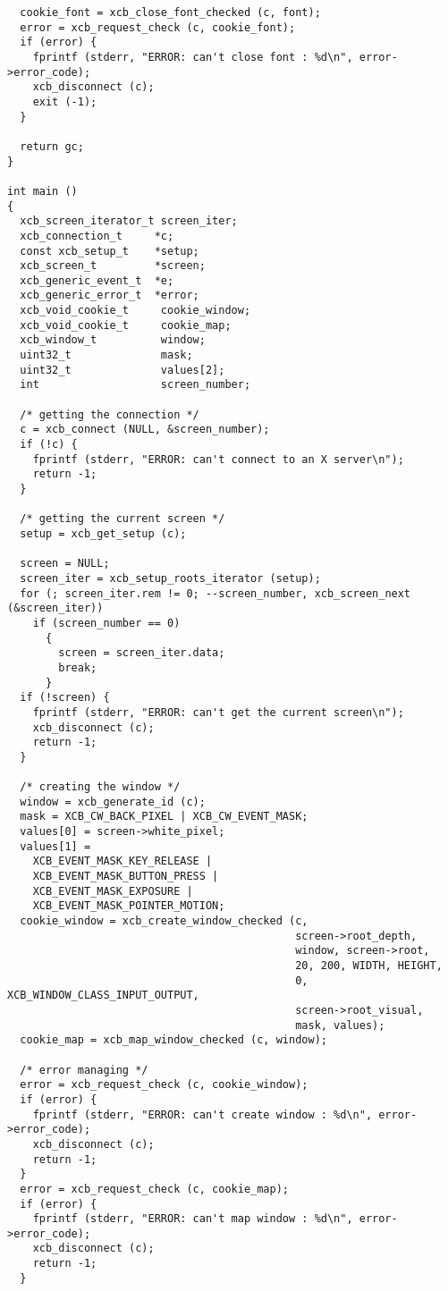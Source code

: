 \documentclass[12pt,oneside,titlepage]{book}
\begin{document}
\begin{enumerate}
\begin{enumerate}
\begin{verbatim}
  cookie_font = xcb_close_font_checked (c, font);
  error = xcb_request_check (c, cookie_font);
  if (error) {
    fprintf (stderr, "ERROR: can't close font : %d\n", error->error_code);
    xcb_disconnect (c);
    exit (-1);
  }

  return gc;
}

int main ()
{
  xcb_screen_iterator_t screen_iter;
  xcb_connection_t     *c;
  const xcb_setup_t    *setup;
  xcb_screen_t         *screen;
  xcb_generic_event_t  *e;
  xcb_generic_error_t  *error;
  xcb_void_cookie_t     cookie_window;
  xcb_void_cookie_t     cookie_map;
  xcb_window_t          window;
  uint32_t              mask;
  uint32_t              values[2];
  int                   screen_number;

  /* getting the connection */
  c = xcb_connect (NULL, &screen_number);
  if (!c) {
    fprintf (stderr, "ERROR: can't connect to an X server\n");
    return -1;
  }

  /* getting the current screen */
  setup = xcb_get_setup (c);

  screen = NULL;
  screen_iter = xcb_setup_roots_iterator (setup);
  for (; screen_iter.rem != 0; --screen_number, xcb_screen_next (&screen_iter))
    if (screen_number == 0)
      {
        screen = screen_iter.data;
        break;
      }
  if (!screen) {
    fprintf (stderr, "ERROR: can't get the current screen\n");
    xcb_disconnect (c);
    return -1;
  }

  /* creating the window */
  window = xcb_generate_id (c);
  mask = XCB_CW_BACK_PIXEL | XCB_CW_EVENT_MASK;
  values[0] = screen->white_pixel;
  values[1] =
    XCB_EVENT_MASK_KEY_RELEASE |
    XCB_EVENT_MASK_BUTTON_PRESS |
    XCB_EVENT_MASK_EXPOSURE |
    XCB_EVENT_MASK_POINTER_MOTION;
  cookie_window = xcb_create_window_checked (c,
                                             screen->root_depth,
                                             window, screen->root,
                                             20, 200, WIDTH, HEIGHT,
                                             0, XCB_WINDOW_CLASS_INPUT_OUTPUT,
                                             screen->root_visual,
                                             mask, values);
  cookie_map = xcb_map_window_checked (c, window);

  /* error managing */
  error = xcb_request_check (c, cookie_window);
  if (error) {
    fprintf (stderr, "ERROR: can't create window : %d\n", error->error_code);
    xcb_disconnect (c);
    return -1;
  }
  error = xcb_request_check (c, cookie_map);
  if (error) {
    fprintf (stderr, "ERROR: can't map window : %d\n", error->error_code);
    xcb_disconnect (c);
    return -1;
  }


\end{verbatim}
\end{enumerate}
\end{enumerate}
\end{document}
